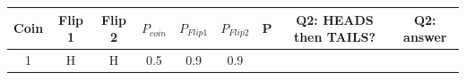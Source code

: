 \documentclass[]{book}
\begin{document}
\begin{longtable}[]{@{}ccccccccc@{}}
\toprule
\begin{minipage}[b]{0.04\columnwidth}\centering\strut
Coin\strut
\end{minipage} & \begin{minipage}[b]{0.04\columnwidth}\centering\strut
Flip 1\strut
\end{minipage} & \begin{minipage}[b]{0.04\columnwidth}\centering\strut
Flip 2\strut
\end{minipage} & \begin{minipage}[b]{0.04\columnwidth}\centering\strut
\(P_{coin}\)\strut
\end{minipage} & \begin{minipage}[b]{0.04\columnwidth}\centering\strut
\(P_{Flip 1}\)\strut
\end{minipage} & \begin{minipage}[b]{0.04\columnwidth}\centering\strut
\(P_{Flip 2}\)\strut
\end{minipage} & \begin{minipage}[b]{0.04\columnwidth}\centering\strut
P\strut
\end{minipage} & \begin{minipage}[b]{0.04\columnwidth}\centering\strut
Q2: HEADS then TAILS?\strut
\end{minipage} & \begin{minipage}[b]{0.04\columnwidth}\centering\strut
Q2: answer\strut
\end{minipage}\tabularnewline
\midrule
\endhead
\begin{minipage}[t]{0.04\columnwidth}\centering\strut
1\strut
\end{minipage} & \begin{minipage}[t]{0.04\columnwidth}\centering\strut
H\strut
\end{minipage} & \begin{minipage}[t]{0.04\columnwidth}\centering\strut
H\strut
\end{minipage} & \begin{minipage}[t]{0.04\columnwidth}\centering\strut
0.5\strut
\end{minipage} & \begin{minipage}[t]{0.04\columnwidth}\centering\strut
0.9\strut
\end{minipage} & \begin{minipage}[t]{0.04\columnwidth}\centering\strut
0.9\strut
\end{minipage} & \begin{minipage}[t]{0.04\columnwidth}\centering\strut

\end{minipage}
\end{longtable}
\end{document}
